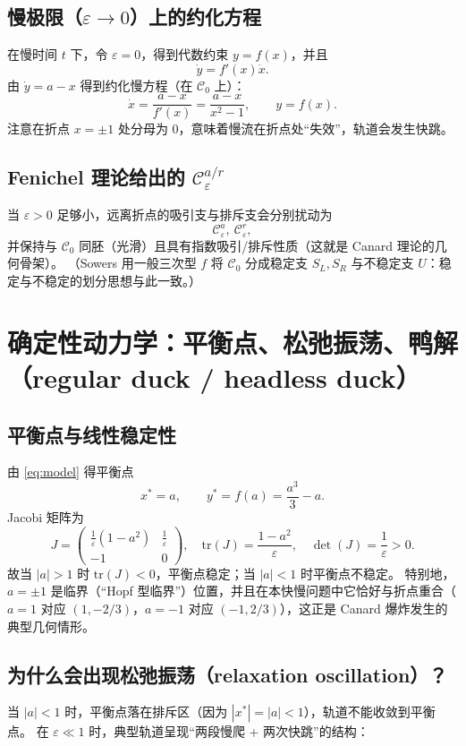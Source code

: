 \documentclass[a4paper,twoside,openany,UTF8]{article}  %
\numberwithin{equation}{section}  %
\numberwithin{equation}{section}  %
\begin{document}
\subsection{慢极限（$\varepsilon\to0$）上的约化方程}
在慢时间 $t$ 下，令 $\varepsilon=0$，得到代数约束 $y=f(x)$，并且
\[
\dot y = f'(x)\dot x.
\]
由 $\dot y=a-x$ 得到约化慢方程（在 $\mathcal C_0$ 上）：
\begin{equation}\label{eq:reduced}
	\dot x = \frac{a-x}{f'(x)}=\frac{a-x}{x^2-1},
	\qquad y=f(x).
\end{equation}
注意在折点 $x=\pm1$ 处分母为 $0$，意味着慢流在折点处“失效”，轨道会发生快跳。

\subsection{Fenichel 理论给出的 $\mathcal C_\varepsilon^{a/r}$}
当 $\varepsilon>0$ 足够小，远离折点的吸引支与排斥支会分别扰动为
\[
\mathcal C_\varepsilon^{a},\ \mathcal C_\varepsilon^{r},
\]
并保持与 $\mathcal C_0$ 同胚（光滑）且具有指数吸引/排斥性质（这就是 Canard 理论的几何骨架）。
（Sowers 用一般三次型 $f$ 将 $\mathcal C_0$ 分成稳定支 $S_L,S_R$ 与不稳定支 $U$：稳定与不稳定的划分思想与此一致。）%

\section{确定性动力学：平衡点、松弛振荡、鸭解（regular duck / headless duck）}

\subsection{平衡点与线性稳定性}
由 \eqref{eq:model} 得平衡点
\[
x^\ast=a,\qquad y^\ast=f(a)=\frac{a^3}{3}-a.
\]
Jacobi 矩阵为
\[
J=
\begin{pmatrix}
	\frac{1}{\varepsilon}(1-a^2) & \frac{1}{\varepsilon}\\[3pt]
	-1 & 0
\end{pmatrix},
\quad
\mathrm{tr}(J)=\frac{1-a^2}{\varepsilon},\quad
\det(J)=\frac{1}{\varepsilon}>0.
\]
故当 $|a|>1$ 时 $\mathrm{tr}(J)<0$，平衡点稳定；当 $|a|<1$ 时平衡点不稳定。
特别地，$a=\pm1$ 是临界（“Hopf 型临界”）位置，并且在本快慢问题中它恰好与折点重合（$a=1$ 对应 $(1,-2/3)$，$a=-1$ 对应 $(-1,2/3)$），这正是 Canard 爆炸发生的典型几何情形。

\subsection{为什么会出现松弛振荡（relaxation oscillation）？}
当 $|a|<1$ 时，平衡点落在排斥区（因为 $|x^\ast|=|a|<1$），轨道不能收敛到平衡点。
在 $\varepsilon\ll1$ 时，典型轨道呈现“两段慢爬 + 两次快跳”的结构：
\end{document}
